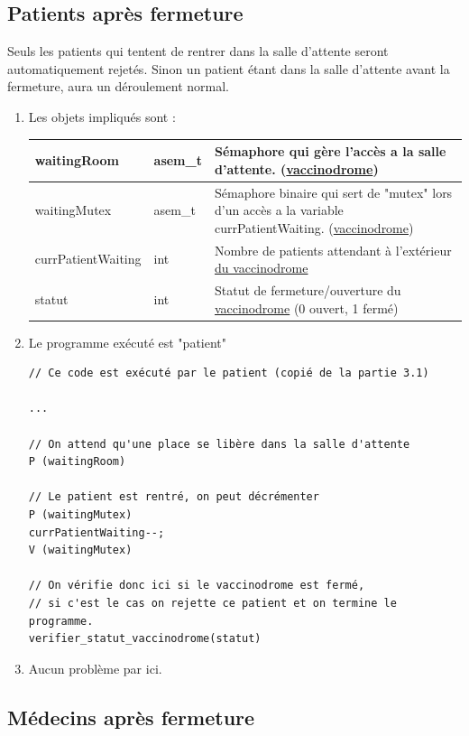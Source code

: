 \documentclass[a4paper]{article}
\begin{document}
\subsection{Patients après fermeture}

  Seuls les patients qui tentent de rentrer dans la salle d'attente seront automatiquement rejetés.
  Sinon un patient étant dans la salle d'attente avant la fermeture, aura un déroulement normal.

  \begin{enumerate}
    \item Les objets impliqués sont :

    \begin{tabularx}{\linewidth}{|l|l|>{\strut}X|}
      \hline%
    waitingRoom & asem\_t & Sémaphore qui gère l'accès a la salle d'attente. (\underline{vaccinodrome}) \\ \hline%

     waitingMutex & asem\_t & Sémaphore binaire qui sert de "mutex" lors d'un accès a la variable currPatientWaiting. (\underline{vaccinodrome}) \\ \hline%
     currPatientWaiting & int & Nombre de patients attendant à l'extérieur \underline{du vaccinodrome} \\ \hline%
     statut & int & Statut de fermeture/ouverture du \underline{vaccinodrome} (0 ouvert, 1 fermé) \\ \hline%
    \end{tabularx}

  \item Le programme exécuté est "patient"

\begin{verbatim}
// Ce code est exécuté par le patient (copié de la partie 3.1)

...

// On attend qu'une place se libère dans la salle d'attente
P (waitingRoom)

// Le patient est rentré, on peut décrémenter
P (waitingMutex)
currPatientWaiting--;
V (waitingMutex)

// On vérifie donc ici si le vaccinodrome est fermé,
// si c'est le cas on rejette ce patient et on termine le programme.
verifier_statut_vaccinodrome(statut)
\end{verbatim}

  \item Aucun problème par ici.
  \end{enumerate}
\newpage

\subsection{Médecins après fermeture}
\end{document}
